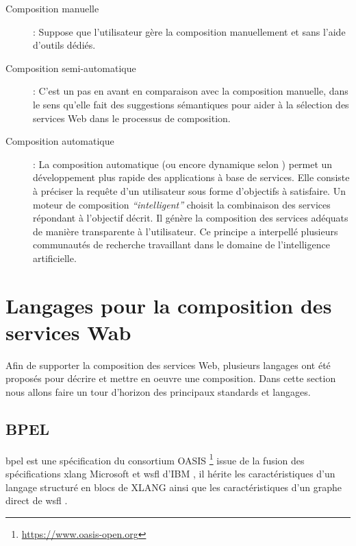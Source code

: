     \renewcommand{\descriptionlabel}[1]{\hspace{0.5cm}\textbullet~\textsf{#1}}
    \begin{description}
    \item[Composition manuelle]: Suppose que l'utilisateur gère la
      composition manuellement et sans l'aide d'outils dédiés.

    \item[Composition semi-automatique]: C'est un pas en avant en
      comparaison avec la composition manuelle, dans le sens qu'elle
      fait des suggestions sémantiques pour aider à la sélection des
      services Web dans le processus de composition.

    \item[Composition automatique]: La composition automatique (ou
      encore dynamique selon \cite{fluegge2006challenges}) permet un
      développement plus rapide des applications à base de
      services. Elle consiste à préciser la requête d'un utilisateur
      sous forme d'objectifs à satisfaire. Un moteur de composition
      \textit{``intelligent''} choisit la combinaison des services
      répondant à l'objectif décrit. Il génère la composition des
      services adéquats de manière transparente à l'utilisateur. Ce
      principe a interpellé plusieurs communautés de recherche
      travaillant dans le domaine de l'intelligence artificielle.
      \cite{elie2010}
    \end{description}
    \enddescription

\section{Langages pour la composition des services Wab}
\label{sec:lang-de-comp}
Afin de supporter la composition des services Web, plusieurs langages
ont été proposés pour décrire et mettre en oeuvre une composition.
Dans cette section nous allons faire un tour d'horizon des principaux
standards et langages.

  \subsection{BPEL}
  \label{sec:bpel}
  \acrshort{bpel} est une spécification du consortium OASIS
  \footnote{\url{https://www.oasis-open.org}} issue de la fusion des
  spécifications \acrshort{xlang} Microsoft et \acrshort{wsfl} d'IBM ,
  il hérite les caractéristiques d'un langage structuré en blocs de
  \textsc{XLANG} ainsi que les caractéristiques d'un graphe direct de
  \acrshort{wsfl} \cite{driss2011approche}.\medskip

